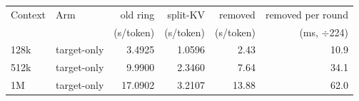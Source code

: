 \begin{tabular}{llrrrr}
\toprule
Context & Arm & old ring & split-KV & removed & removed per round \\
 & & (s/token) & (s/token) & (s/token) & (ms, $\div$224) \\
\midrule
128k & target-only & 3.4925 & 1.0596 & 2.43 & 10.9 \\
512k & target-only & 9.9900 & 2.3460 & 7.64 & 34.1 \\
1M & target-only & 17.0902 & 3.2107 & 13.88 & 62.0 \\
\bottomrule
\end{tabular}
